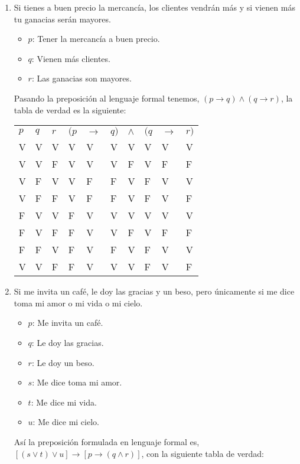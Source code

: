 \documentclass[a4paper,10pt]{article}
\begin{document}
\begin{enumerate}
\newpage
\item Si tienes a buen precio la mercancía, los clientes vendrán más y si vienen más tu ganacias serán mayores.
\begin{itemize}
 \item \(p\): Tener la mercancía a buen precio.
 \item \(q\): Vienen más clientes.
 \item \(r\): Las ganacias son mayores.
\end{itemize}
Pasando la preposición al lenguaje formal tenemos, \( (p \to q) \land (q \to r) \), la tabla de verdad es la siguiente:
\begin{center}
\begin{tabular}{llllllllll}
\(p\) & \(q\) & \(r\) & \((p\) & \(\to\) & \(q)\) & \(\land\) & \((q\) & \(\to\) & \(r)\)\\
V & V & V & V & V & V & V & V & V & V\\
V & V & F & V & V & V & F & V & F & F\\
V & F & V & V & F & F & V & F & V & V\\
V & F & F & V & F & F & V & F & V & F\\
F & V & V & F & V & V & V & V & V & V\\
F & V & F & F & V & V & F & V & F & F\\
F & F & V & F & V & F & V & F & V & V\\
V & V & F & F & V & V & V & F & V & F
\end{tabular}
\end{center}

\item Si me invita un café, le doy las gracias y un beso, pero únicamente si me dice toma mi amor o mi vida o mi cielo.
\begin{itemize}
 \item \(p\): Me invita un café.
 \item \(q\): Le doy las gracias.
 \item \(r\): Le doy un beso.
 \item \(s\): Me dice toma mi amor.
 \item \(t\): Me dice mi vida.
 \item \(u\): Me dice mi cielo.
\end{itemize}
Así la preposición formulada en lenguaje formal es, \( [(s \lor t) \lor u] \to [p \to (q \land r)]\), con la siguiente tabla de verdad:


\end{enumerate}
\end{document}

